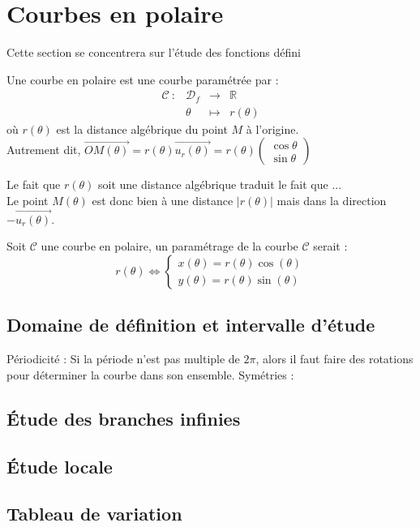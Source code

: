 \section{Courbes en polaire}
Cette section se concentrera sur l'étude des fonctions défini
\begin{defi}
Une courbe en polaire est une courbe paramétrée par :
$$\begin{array}{cccc}
    \mathscr{C} \ : & \mathscr{D}_{f} & \to & \mathbb{R} \\
         & \theta & \mapsto & r(\theta)
\end{array}$$
où $r(\theta)$ est la distance algébrique du point $M$ à l'origine.\\
Autrement dit, $\overrightarrow{OM(\theta)}=r(\theta)\overrightarrow{u_r(\theta)}=r(\theta)\begin{pmatrix}\cos\theta\\\sin\theta\end{pmatrix}$
\end{defi}
Le fait que $r(\theta)$ soit une distance algébrique traduit le fait que ...\\
Le point $M(\theta)$ est donc bien à une distance $|r(\theta)|$ mais dans la direction $-\overrightarrow{u_r(\theta)}$.
\begin{prop}
Soit $\mathscr{C}$ une courbe en polaire, un paramétrage de la courbe $\mathscr{C}$ serait :
$$r(\theta)\Leftrightarrow\begin{cases}x(\theta)=r(\theta)\cos(\theta)\\y(\theta)=r(\theta)\sin(\theta)\end{cases}$$
\end{prop}
\subsection{Domaine de définition et intervalle d'étude}
Périodicité :
Si la période n'est pas multiple de $2\pi$, alors il faut faire des rotations pour déterminer la courbe dans son ensemble.
Symétries :

\subsection{Étude des branches infinies}
\subsection{Étude locale}
\subsection{Tableau de variation}
